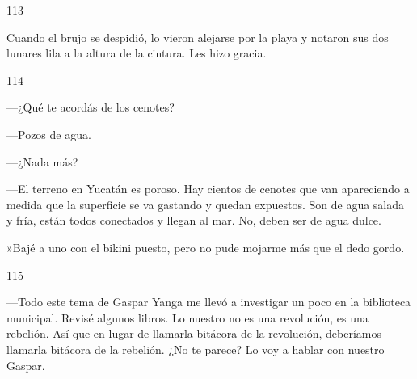 \documentclass[12pt,twoside,openright,a5paper]{book}
\begin{document}
\hrulefill \hspace{0.1cm}\decofourleft\hspace{0.2cm} 113 \hspace{0.2cm}\decofourright \hspace{0.1cm}\hrulefill

\nopagebreak

\vspace{0.5cm}

\nopagebreak

Cuando el brujo se despidió, lo vieron alejarse por la playa y notaron sus dos lunares
lila a la altura de la cintura. Les hizo gracia.

\vspace{0.5cm}

\hrulefill \hspace{0.1cm}\decofourleft\hspace{0.2cm} 114 \hspace{0.2cm}\decofourright \hspace{0.1cm}\hrulefill

\nopagebreak

\vspace{0.5cm}

\nopagebreak

---¿Qué te acordás de los cenotes?

---Pozos de agua.

---¿Nada más?

---El terreno en Yucatán es poroso. Hay cientos de cenotes que van apareciendo a medida
que la superficie se va gastando y quedan expuestos. Son de agua salada
y fría, están todos conectados y llegan al mar. No, deben ser de agua
dulce.

»Bajé a uno con el bikini puesto, pero no pude mojarme más que el dedo gordo.


\vspace{0.5cm}
\afterpage{}
\hrulefill \hspace{0.1cm}\decofourleft\hspace{0.2cm} 115 \hspace{0.2cm}\decofourright \hspace{0.1cm}\hrulefill

\nopagebreak

\vspace{0.5cm}

\nopagebreak

---Todo este tema de Gaspar Yanga me llevó a investigar un poco en
la biblioteca municipal. Revisé algunos libros. Lo nuestro no es
una revolución, es una rebelión. Así que en lugar de
llamarla bitácora de la revolución, deberíamos llamarla bitácora de la
rebelión. ¿No te parece? Lo voy a hablar con nuestro Gaspar.
\end{document}
